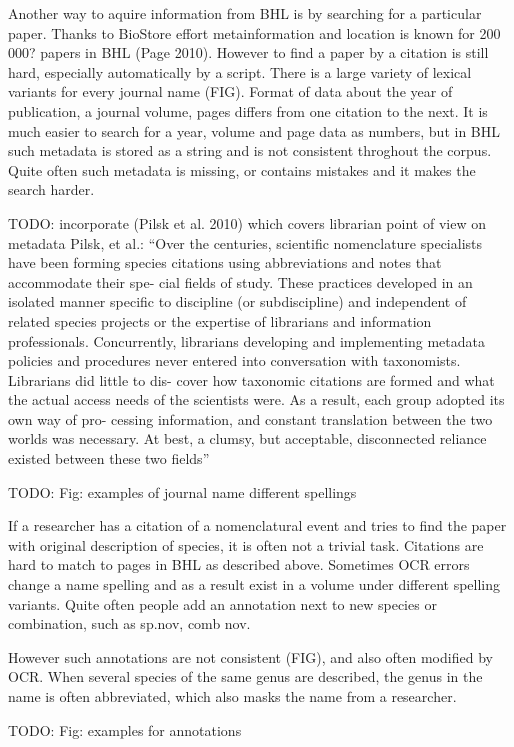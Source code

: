 \documentclass[
]{article}
\begin{document}
Another way to aquire information from BHL is by searching for a
particular paper. Thanks to BioStore effort metainformation and location
is known for 200 000? papers in BHL (Page 2010). However to find a paper
by a citation is still hard, especially automatically by a script. There
is a large variety of lexical variants for every journal name (FIG).
Format of data about the year of publication, a journal volume, pages
differs from one citation to the next. It is much easier to search for a
year, volume and page data as numbers, but in BHL such metadata is
stored as a string and is not consistent throghout the corpus. Quite
often such metadata is missing, or contains mistakes and it makes the
search harder.

TODO: incorporate (Pilsk et al. 2010) which covers librarian point of
view on metadata Pilsk, et al.: ``Over the centuries, scientific
nomenclature specialists have been forming species citations using
abbreviations and notes that accommodate their spe- cial fields of
study. These practices developed in an isolated manner specific to
discipline (or subdiscipline) and independent of related species
projects or the expertise of librarians and information professionals.
Concurrently, librarians developing and implementing metadata policies
and procedures never entered into conversation with taxonomists.
Librarians did little to dis- cover how taxonomic citations are formed
and what the actual access needs of the scientists were. As a result,
each group adopted its own way of pro- cessing information, and constant
translation between the two worlds was necessary. At best, a clumsy, but
acceptable, disconnected reliance existed between these two fields''

TODO: Fig: examples of journal name different spellings

If a researcher has a citation of a nomenclatural event and tries to
find the paper with original description of species, it is often not a
trivial task. Citations are hard to match to pages in BHL as described
above. Sometimes OCR errors change a name spelling and as a result exist
in a volume under different spelling variants. Quite often people add an
annotation next to new species or combination, such as sp.nov, comb nov.

However such annotations are not consistent (FIG), and also often
modified by OCR. When several species of the same genus are described,
the genus in the name is often abbreviated, which also masks the name
from a researcher.

TODO: Fig: examples for annotations
\end{document}
